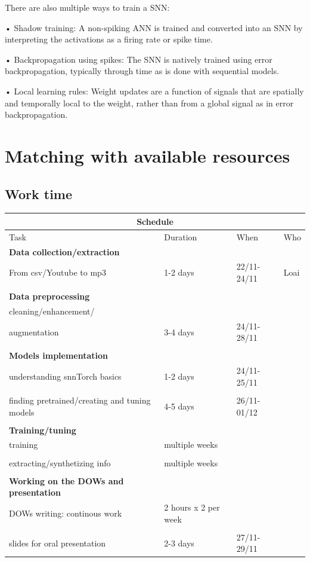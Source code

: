 \documentclass[11pt]{article}
\begin{document}
There are also multiple ways to train a SNN:

• Shadow training: A non-spiking ANN is trained and converted into an SNN by interpreting the activations as a firing rate or spike time.

• Backpropagation using spikes: The SNN is natively trained using error backpropagation, typically through time as is done with sequential models.

• Local learning rules: Weight updates are a function of signals that are spatially and temporally local to the weight, rather than from a global signal as in error backpropagation.



\section{Matching with available resources}
\subsection{Work time}


\begin{center}
\begin{tabular}{ |p{5cm}||p{3cm}|p{3cm}|p{2cm}|  }
 \hline
 \multicolumn{4}{|c|}{Schedule} \\
 \hline
 Task& Duration  & When & Who\\
 \hline
\textbf{Data collection/extraction}&&& \\
From csv/Youtube to mp3 & 1-2 days& 22/11-24/11 & Loai\\
&&&\\
\textbf{Data preprocessing}&&&\\
cleaning/enhancement/&&&\\
augmentation& 3-4 days&24/11-28/11&\\
&&&\\
\textbf{Models implementation}&&&\\
understanding snnTorch basics&1-2 days &24/11-25/11&\\
&&&\\
finding pretrained/creating and tuning models & 4-5 days & 26/11-01/12 &\\
&&&\\
\textbf{Training/tuning}&&&\\
training&multiple weeks&&\\
&&&\\
extracting/synthetizing info&multiple weeks&&\\
&&&\\
\textbf{Working on the DOWs and presentation}&&&\\
DOWs writing: continous work& 2 hours x 2 per week & &\\
&&&\\
slides for oral presentation& 2-3 days&27/11-29/11&\\
 \hline
\end{tabular}
\end{center}
\end{document}
